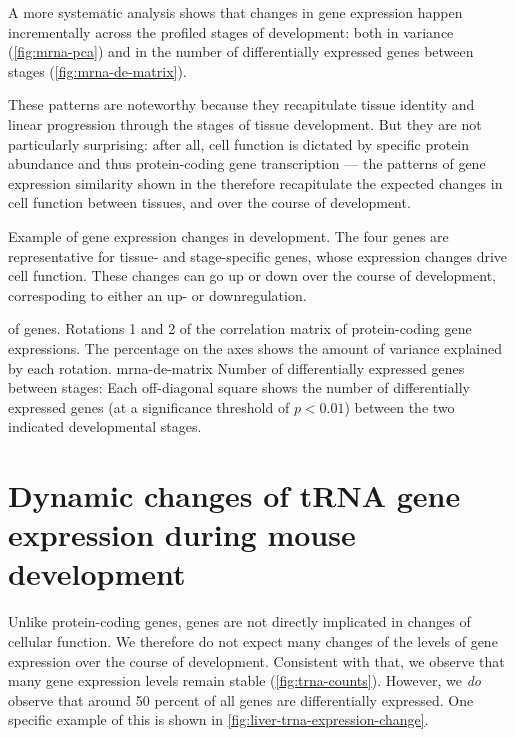 A more systematic analysis shows that changes in gene expression happen
incrementally across the profiled stages of development: both in variance
(\cref{fig:mrna-pca}) and in the number of differentially expressed genes
between stages (\cref{fig:mrna-de-matrix}).

These patterns are noteworthy because they recapitulate tissue identity and
linear progression through the stages of tissue development. But they are not
particularly surprising: after all, cell function is dictated by specific
protein abundance and thus protein-coding gene transcription --- the patterns of
gene expression similarity shown in the \pca therefore recapitulate the expected
changes in cell function between tissues, and over the course of development.

    {Example of gene expression changes in development.}
    {The four genes are representative for tissue- and stage-specific genes,
    whose expression changes drive cell function. These changes can go up or
    down over the course of development, correspoding to either an up- or
    downregulation.}

    {\pca of \mrna genes.}
    {Rotations \num{1} and \num{2} of the correlation matrix of
    protein-coding gene expressions. The percentage on the axes shows
    the amount of variance explained by each rotation.}
    {mrna-de-matrix}
    {Number of differentially expressed \mrna genes between stages:}
    {Each off-diagonal square shows the number of differentially
    expressed genes (at a significance threshold of \(p<0.01\)) between
    the two indicated developmental stages.}

\section{Dynamic changes of tRNA gene expression during mouse development}

Unlike protein-coding genes, \trna genes are not directly implicated in changes
of cellular function. We therefore do not expect many changes of the levels of
\trna gene expression over the course of development. Consistent with that, we
observe that many \trna gene expression levels remain stable
(\cref{fig:trna-counts}). However, we \emph{do} observe that around \num{50}
percent of all \trna genes are differentially expressed. One specific example of
this is shown in \cref{fig:liver-trna-expression-change}.

